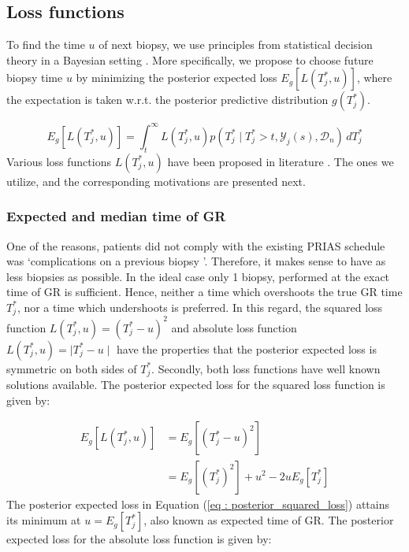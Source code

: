 \subsection{Loss functions}
\label{subsec : loss_functions}
To find the time $u$ of next biopsy, we use principles from statistical decision theory in a Bayesian setting \citep{bergerDecisionTheory,robertBayesianChoice}. More specifically, we propose to choose future biopsy time $u$ by minimizing the posterior expected loss $E_g[L(T^*_j, u)]$, where the expectation is taken w.r.t. the posterior predictive distribution $g(T^*_j)$. 

\begin{equation*}
E_g[L(T^*_j, u)] = \int_t^\infty L(T^*_j, u) p(T^*_j \mid T^*_j > t, \mathcal{Y}_j(s), \mathcal{D}_n) \,dT^*_j
\end{equation*}
Various loss functions $L(T^*_j, u)$ have been proposed in literature \citep{robertBayesianChoice}. The ones we utilize, and the corresponding motivations are presented next.

\subsubsection{Expected and median time of GR}
\label{subsubsec : exp_median_fail_time}
One of the reasons, patients did not comply with the existing PRIAS schedule was \textquoteleft complications on a previous biopsy \textquoteright. Therefore, it makes sense to have as less biopsies as possible. In the ideal case only 1 biopsy, performed at the exact time of GR is sufficient. Hence, neither a time which overshoots the true GR time $T^*_j$, nor a time which undershoots is preferred. In this regard, the squared loss function $L(T^*_j, u) = (T^*_j - u)^2$ and absolute loss function $L(T^*_j, u) = \mid T^*_j - u \mid$ have the properties that the posterior expected loss is symmetric on both sides of $T^*_j$. Secondly, both loss functions have well known solutions available. The posterior expected loss for the squared loss function is given by:

\begin{equation}
\label{eq : posterior_squared_loss}
\begin{split}
E_g[L(T^*_j, u)] &= E_g[(T^*_j - u)^2]\\
&=E_g[(T^*_j)^2] + u^2 -2uE_g[T^*_j]
\end{split}
\end{equation}
The posterior expected loss in Equation (\ref{eq : posterior_squared_loss}) attains its minimum at $u = E_g[T^*_j]$, also known as expected time of GR. The posterior expected loss for the absolute loss function is given by:

